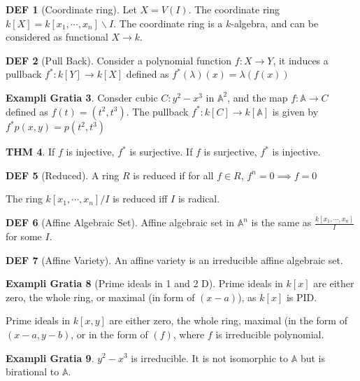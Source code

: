 \documentclass[twocolumn]{article}
\newcommand{\A}{\mathbb{A}}
\theoremstyle{definition}
\newtheorem{thm}{THM}
\newtheorem{example}[thm]{Exampli Gratia}
\newtheorem{defi}[thm]{DEF}
\theoremstyle{remark}
\begin{document}
\begin{defi}[Coordinate ring]
	Let $X = V(I)$. The coordinate ring $k[X] = k[x_1, \cdots, x_n ] \backslash I$. 
	The coordinate ring is a $k$-algebra, and can be considered as functional $X \rightarrow k$.
\end{defi}

\begin{defi}[Pull Back]
	Consider a polynomial function $f: X \rightarrow Y$, it induces a pullback $f^*: k[Y] \rightarrow k[X]$ defined as $f^*(\lambda)(x) = \lambda(f(x))$
\end{defi}

\begin{example}
	Consder cubic $C:y^2 - x^3$ in $\A^2$, and the map $f:\A \rightarrow C$ defined as $f(t) = (t^2, t^3)$.
	The pullback $f^*: k[C] \rightarrow k[\A]$ is given by
	$f^*{p(x,y)} = p(t^2, t^3)$
\end{example}

\begin{thm}
	If $f$ is injective, $f^*$ is surjective. 
	If $f$ is surjective, $f^*$ is injective.
\end{thm}

\begin{defi}[Reduced]
	A ring $R$ is reduced if for all $f \in R$, $f^n = 0 \implies f= 0$

	The ring $k[x_1, \cdots, x_n]/I$ is reduced iff $I$ is radical.
\end{defi}

\begin{defi}[Affine Algebraic Set]
	Affine algebraic set in $\A^n$ is the same as $\frac{k[x_1, \cdots, x_n]}{I}$ for some $I$.
\end{defi}

\begin{defi}[Affine Variety]
	An affine variety is an irreducible affine algebraic set.
\end{defi}

\begin{example}[Prime ideals in 1 and 2 D]
	Prime ideals in $k[x]$ are either zero, the whole ring, or maximal (in form of $(x-a)$), as $k[x]$ is PID.

	Prime ideals in $k[x,y]$  are either zero, the whole ring, maximal (in the form of $(x-a, y-b)$, or in the form of $(f)$, where $f$ is irreducible polynomial.
\end{example}

\begin{example}
	$y^2 - x^3$ is irreducible. It is not isomorphic to $\A$ but is birational to $\A$.
\end{example}
\end{document}

